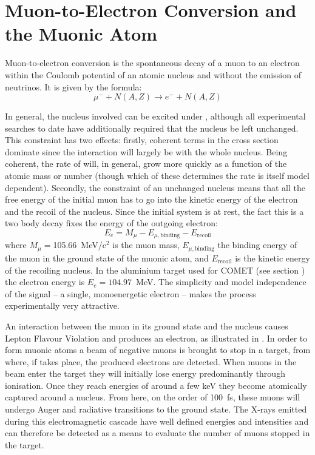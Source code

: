 
\chapter{Muon-to-Electron Conversion and the Muonic Atom}
Muon-to-electron conversion is the spontaneous decay of a muon to an electron within the Coulomb potential of an atomic nucleus and without the emission of neutrinos.
It is given by the formula:
\begin{equation}
\mu^{-}+N(A,Z) \rightarrow e^{-}+N(A,Z)
\end{equation}

In general, the nucleus involved can be excited under \mueconv, although all experimental searches to date have additionally required that the nucleus be left unchanged.
This constraint has two effects: firstly, coherent terms in the \mueconv cross section dominate since the interaction will largely be with the whole nucleus.
Being coherent, the rate of \mueconv will, in general, grow more quickly as a function of the atomic mass or number (though which of these determines the rate is itself model dependent).
Secondly, the constraint of an unchanged nucleus means that all the free energy of the initial muon has to go into the kinetic energy of the electron and the recoil of the nucleus.
Since the initial system is at rest, the fact this is a two body decay fixes the energy of the outgoing electron:
\begin{equation}
E_e=M_\mu-E_{\mu,\mathrm{binding}}-E_\mathrm{recoil}
\end{equation}
where $M_\mu=$105.66~MeV/c$^2$ is the muon mass, $E_{\mu,\mathrm{binding}}$ the
binding energy of the muon in the ground state of the muonic atom, and
$E_\mathrm{recoil}$ is the kinetic energy of the recoiling nucleus.
In the aluminium target used for COMET (see section ) the electron energy is $E_e=104.97$~MeV.
The simplicity and model independence of the signal -- a single, monoenergetic electron -- makes the process experimentally very attractive.

\FigMuecCreation
An interaction between the muon in its ground state and the nucleus causes Lepton Flavour Violation and produces an electron, as illustrated in .
In order to form muonic atoms a beam of negative muons is brought to stop in a target, from where, if \mueconv takes place, the produced electrons are detected.
When muons in the beam enter the target they will initially lose energy predominantly through ionisation.
Once they reach energies of around a few keV they become atomically captured around a nucleus.
From here, on the order of 100~fs, these muons will undergo Auger and radiative transitions to the ground state.
The X-rays emitted during this electromagnetic cascade have well defined energies and intensities and can therefore be detected as a means to evaluate the number of muons stopped in the target.


